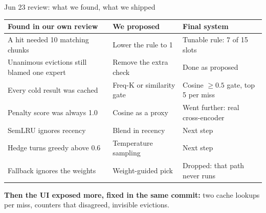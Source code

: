 \documentclass[aspectratio=169,11pt]{beamer}
\begin{document}
\begin{frame}{Jun 23 review: what we found, what we shipped}
\footnotesize
\renewcommand{\arraystretch}{1.18}
\begin{tabular}{@{}p{4.5cm}p{3.7cm}p{4.9cm}@{}}
\toprule
\textbf{Found in our own review} & \textbf{We proposed} & \textbf{Final system} \\
\midrule
A hit needed 10 matching chunks & Lower the rule to 1 &
  \textcolor{cmgreen}{Tunable rule: 7 of 15 slots} \\
Unanimous evictions still blamed one expert & Remove the extra check &
  \textcolor{cmgreen}{Done as proposed} \\
Every cold result was cached & Freq-K or similarity gate &
  \textcolor{cmgreen}{Cosine $\geq 0.5$ gate, top 5 per miss} \\
Penalty score was always 1.0 & Cosine as a proxy &
  \textcolor{cmgreen}{Went further: real cross-encoder} \\
SemLRU ignores recency & Blend in recency &
  \textcolor{cmgrey}{Next step} \\
Hedge turns greedy above 0.6 & Temperature sampling &
  \textcolor{cmgrey}{Next step} \\
Fallback ignores the weights & Weight-guided pick &
  \textcolor{cmgrey}{Dropped: that path never runs} \\
\bottomrule
\end{tabular}

\vspace{6pt}
\small
\textbf{Then the UI exposed more, fixed in the same commit:} two cache
lookups per miss, counters that disagreed, invisible evictions.
\end{frame}
\end{document}
